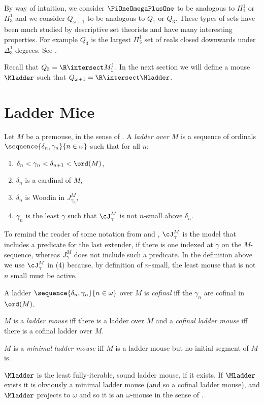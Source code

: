 \documentclass[oneside,12pt]{amsart}
\begin{document}
By way of intuition, we consider $\PiOneOmegaPlusOne$ to be analogous to
$\Pi^1_1$ or $\Pi^1_3$ and we consider $Q_{\omega+1}$ to be analogous to
$Q_1$ or $Q_3$. These types of sets have been much studied by
descriptive set theorists and have many interesting properties.
For example $Q_3$ is the largest $\Pi^1_3$ set of reals closed downwards
under $\Delta^1_3$-degrees. See \cite{Q_Theory}.

Recall that $Q_3 = \R \intersect M_1^{\sharp}$. In the next section we will
define a mouse $\Mladder$ such that $Q_{\omega+1} = \R\intersect\Mladder$.

\section{Ladder Mice}
\label{section:laddermice}
\begin{definition}
Let $M$ be a premouse, in the sense of \cite{FSIT}. A \emph{ladder over $M$}
is a sequence of ordinals $\sequence{\delta_n,\gamma_n}{n\in\omega}$ such that
for all $n$:
\begin{enumerate}
\item $\delta_n < \gamma_n < \delta_{n+1} < \ord(M)$,
\item $\delta_n$ is a cardinal of $M$,
\item $\delta_n$ is Woodin in $J^M_{\gamma_n}$,
\item $\gamma_n$ is the least $\gamma$ such that $\cJ^M_{\gamma}$ is not $n$-small above $\delta_n$.
\end{enumerate}

To remind the reader of some notation from \cite{FSIT} and \cite{Many_Woodins},
$\cJ^M_{\gamma}$ is the model that includes a predicate for the 
last extender, if there is one indexed at $\gamma$ on the $M$-sequence,
whereas $J^M_{\gamma}$ does not include
such a predicate. In the definition above we use $\cJ^M_{\gamma}$ in (4)
because, by definition of $n$-small, the least mouse that is not $n$ small
must be active.

A ladder $\sequence{\delta_n,\gamma_n}{n\in\omega}$ over $M$ is \emph{cofinal}
iff the $\gamma_n$ are cofinal in $\ord(M)$.

$M$ is a \emph{ladder mouse} iff there is a ladder over $M$ and a
\emph{cofinal ladder mouse} iff there is a cofinal ladder over $M$.

$M$ is a \emph{minimal ladder mouse} iff $M$ is a ladder mouse but no initial
segment of $M$ is.

$\Mladder$ is the least fully-iterable, sound ladder mouse, if it exists. If
$\Mladder$ exists it is obviously a minimal ladder mouse (and so a cofinal
ladder mouse), and $\Mladder$ projects to $\omega$ and so it is an $\omega$-mouse
in the sense of \cite{Proj_WO_In_Mod}.
\end{definition}
\end{document}

